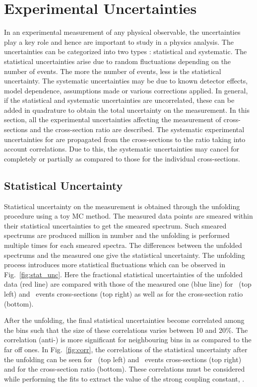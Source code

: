 \section{Experimental Uncertainties}
\label{sec:exp_unc}
In an experimental measurement of any physical observable, the uncertainties play a key role and hence are important to study in a physics analysis. The uncertainties can be categorized into two types : statistical and systematic. The statistical uncertainties arise due to random fluctuations depending on the number of events. The more the number of events, less is the statistical uncertainty. The systematic uncertainties may be due to known detector effects, model dependence, assumptions made or various corrections applied. In general, if the statistical and systematic uncertainties are uncorrelated, these can be added in quadrature to obtain the total uncertainty on the measurement. In this section, all the experimental uncertainties affecting the measurement of cross-sections and the cross-section ratio \ratio are described. The systematic experimental uncertainties for \ratio are propagated from the cross-sections to the ratio taking into account correlations. Due to this,  the systematic uncertainties may cancel for \ratio completely or partially as compared to those for the individual cross-sections.

\subsection{Statistical Uncertainty}
\label{sec:unfolding_stat}
Statistical uncertainty on the measurement is obtained through the unfolding procedure using a toy MC method. The measured data points are smeared within their statistical uncertainties to get the smeared spectrum. Such smeared spectrums are produced million in number and the unfolding is performed multiple times for each smeared spectra. The differences between the unfolded spectrums and the measured one give the statistical uncertainty. The unfolding process introduces more statistical fluctuations which can be observed in Fig.~\ref{fig:stat_unc}. Here the fractional statistical uncertainties of the unfolded data (red line) are compared with those of the measured one (blue line) for \njt~(top left) and \njth~events cross-sections (top right) as well as for the cross-section ratio \ratio (bottom). 

After the unfolding, the final statistical uncertainties become correlated among the bins such that the size of these correlations varies between 10 and 20\%. The correlation (anti-) is more significant for neighbouring bins in \httwo as  compared to the far off ones. In Fig.~\ref{fig:corr}, the correlations of the statistical uncertainty after the unfolding can be seen for \njt~(top left) and \njth~events cross-sections (top right) and for the cross-section ratio \ratio (bottom). These correlations must be considered while performing the fits to extract the value of the strong coupling constant, \alpsns. 


